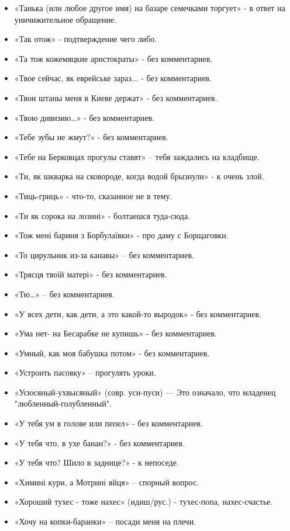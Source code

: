 \begin{itemize}
\item  «Танька (или любое другое имя) на базаре семечками торгует» - в ответ на уничижительное обращение.
\item  «Так отож» - подтверждение чего либо.
\item  «Та тож кожемяцкие аристократы» - без комментариев.
\item  «Твое сейчас, як еврейське зараз... - без комментариев.
\item  «Твои штаны меня в Киеве держат» - без комментариев.
\item  «Твою дивизию…» - без комментариев.
\item  «Тебе зубы не жмут?» - без комментариев.
\item  «Тебе на Берковцах прогулы ставят» – тебя заждались на кладбище.
\item  «Ти, як шкварка на сковороде, когда водой брызнули» - к очень злой.
\item  «Тиць-гриць» - что-то, сказанное не в тему.
\item  «Ти як сорока на лозині» - болтаешся туда-сюда.
\item  «Тож мені бариня з Борбулаївки» - про даму с Борщаговки.
\item  «То цирульник из-за канавы» – без комментариев.
\item  «Трясця твоїй матері» - без комментариев.
\item  «Тю…» – без комментариев.
\item  «У всех дети, как дети, а это какой-то выродок» - без комментариев.
\item  «Ума нет- на Бесарабке не купишь» - без комментариев.
\item  «Умный, как моя бабушка потом» - без комментариев.
\item  «Устроить пасовку» – прогулять уроки.
\item  «Усюсяный-ухвысяный» (совр. уси-пуси) — Это означало, что младенец "любленный-голубленный".
\item  «У тебя ум в голове или пепел» - без комментариев.
\item  «У тебя что, в ухе банан?» - без комментариев.
\item  «У тебя что? Шило в заднице?» - к непоседе.
\item  «Химині кури, а Мотрині яйця» – спорный вопрос.
\item  «Хороший тухес - тоже нахес» (идиш/рус.) - тухес-попа, нахес-счастье. 
\item  «Хочу на копки-баранки» – посади меня на плечи.

\end{itemize}
